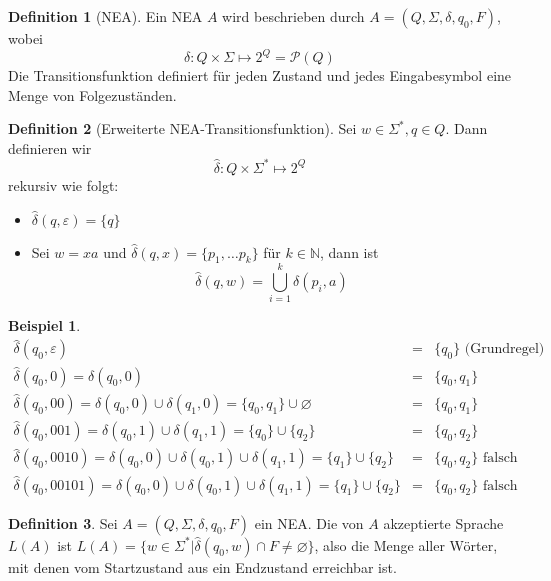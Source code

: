 \documentclass[11pt]{article} %
\theoremstyle{definition}
\newtheorem*{beispiel}{Beispiel}
\newtheorem{definition}{Definition}
\begin{document}
\begin{definition}[NEA]
Ein NEA $A$ wird beschrieben durch $A = (Q,\Sigma, \delta, q_0, F)$, wobei
\[
\delta: Q \times \Sigma \mapsto 2^Q = \mathcal{P}(Q)
\]
Die Transitionsfunktion definiert für jeden Zustand und jedes Eingabesymbol eine Menge von Folgezuständen.
\end{definition}

\begin{definition}[Erweiterte NEA-Transitionsfunktion]
Sei $w \in \Sigma^*, q \in Q$. Dann definieren wir
\[
\hat{\delta}: Q \times \Sigma^* \mapsto 2^Q
\]
rekursiv wie folgt:

\begin{itemize}
\item $\hat\delta(q, \varepsilon) = \{ q \}$
\item Sei $w = xa$ und $\hat\delta(q, x) = \{p_1, \dots p_k\}$ für $k \in \mathbb{N}$, dann ist
\[
\hat\delta(q, w) = \bigcup\limits_{i=1}^k \delta(p_i, a)
\]
\end{itemize}
\end{definition}

\begin{beispiel}
\begin{eqnarray*}
\hat\delta(q_0, \varepsilon) &=& \{q_0 \} \textrm{ (Grundregel)} \\
\hat\delta(q_0, 0) = \delta(q_0, 0) &=& \{q_0, q_1 \} \\
\hat\delta(q_0, 00) = \delta(q_0, 0) \cup \delta(q_1, 0) = \{q_0, q_1\} \cup \varnothing &=& \{q_0, q_1\} \\
\hat\delta(q_0, 001) = \delta(q_0, 1) \cup \delta(q_1, 1) = \{q_0\} \cup \{q_2\} &=& \{q_0, q_2\} \\
\hat\delta(q_0, 0010) = \delta(q_0, 0) \cup \delta(q_0, 1) \cup \delta(q_1, 1) = \{q_1\} \cup \{q_2\} &=& \{q_0, q_2\} \textrm{ falsch} \\
\hat\delta(q_0, 00101) = \delta(q_0, 0) \cup \delta(q_0, 1) \cup \delta(q_1, 1) = \{q_1\} \cup \{q_2\} &=& \{q_0, q_2\} \textrm{ falsch}
\end{eqnarray*}
\end{beispiel}

\begin{definition}
Sei $A = (Q, \Sigma, \delta, q_0, F)$ ein NEA. Die von $A$ akzeptierte Sprache $L(A)$ ist $L(A) = \{ w\in \Sigma^* | \hat\delta(q_0, w) \cap F \neq \varnothing\}$, also die Menge aller Wörter, mit denen vom Startzustand aus ein Endzustand erreichbar ist.
\end{definition}
\end{document}
